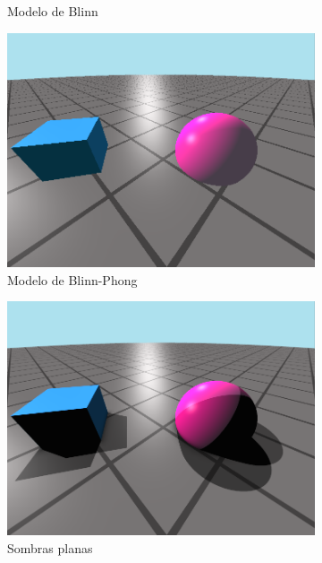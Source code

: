 \begin{figure}[ht!]
\begin{subfigure}[b]{0.3\textwidth}
        \caption{Modelo de Blinn}
    \end{subfigure}
    \hfill
    \begin{subfigure}[b]{0.3\textwidth}
        \centering
        \includegraphics[width=\textwidth]{Plantilla-TFG-master/img/escena3_blinnPhong.png}
        \caption{Modelo de Blinn-Phong}
    \end{subfigure}
    \medskip
    \begin{subfigure}[b]{0.3\textwidth}
        \centering
        \includegraphics[width=\textwidth]{Plantilla-TFG-master/img/escena4_sombraPlana.png}
        \caption{Sombras planas}
    \end{subfigure}
    \hfill
    \begin{subfigure}[b]{0.3\textwidth}

\end{subfigure}
\end{figure}

